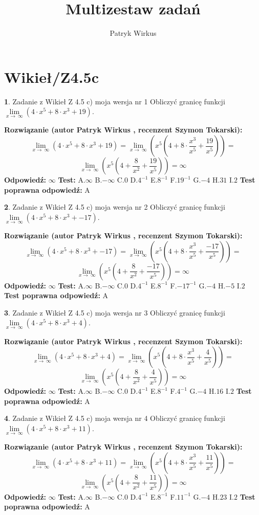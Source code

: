 \documentclass[12pt, a4paper]{article}
\title{Multizestaw zadań}
\author{Patryk Wirkus}
\date{}
\theoremstyle{definition} %
\newtheorem{zad}{}
\newcommand{\kategoria}[1]{\section{#1}}
\newcommand{\zadStart}[1]{\begin{zad}#1\newline}
\newcommand{\zadStop}{\end{zad}}
\newcommand{\rozwStart}[2]{\noindent \textbf{Rozwiązanie (autor #1 , recenzent #2): }\newline}
\newcommand{\rozwStop}{\newline}
\newcommand{\odpStart}{\noindent \textbf{Odpowiedź:}\newline}
\newcommand{\odpStop}{\newline}
\newcommand{\testStart}{\noindent \textbf{Test:}\newline}
\newcommand{\testStop}{\newline}
\newcommand{\kluczStart}{\noindent \textbf{Test poprawna odpowiedź:}\newline}
\newcommand{\kluczStop}{\newline}
\begin{document}
\maketitle

\kategoria{Wikieł/Z4.5c}


\zadStart{Zadanie z Wikieł Z 4.5 c) moja wersja nr 1}
Obliczyć granicę funkcji  $\lim\limits_{x\to\ \infty}(4 \cdot x^{5}+8 \cdot x^{3}+19)$.
\zadStop
\rozwStart{Patryk Wirkus}{Szymon Tokarski}
$$\lim\limits_{x\to\ \infty}(4 \cdot x^{5}+8 \cdot x^{3}+19) = \lim\limits_{x\to\ \infty}(x^{5}(4 +8 \cdot \frac{x^{3}}{x^{5}}+\frac{19}{x^{5}})) =$$ $$\lim\limits_{x\to\ \infty}(x^{5}(4 +\frac{8}{x^{2}}+\frac{19}{x^{5}})) =\infty$$
\rozwStop
\odpStart
$\infty$
\odpStop
\testStart
A.$\infty$ B.$-\infty$ C.$0$ D.$4^{-1}$ E.$8^{-1}$
F.$19^{-1}$ G.$-4$
H.$31$
I.$2$
\testStop
\kluczStart
A
\kluczStop



\zadStart{Zadanie z Wikieł Z 4.5 c) moja wersja nr 2}
Obliczyć granicę funkcji  $\lim\limits_{x\to\ \infty}(4 \cdot x^{5}+8 \cdot x^{3}+-17)$.
\zadStop
\rozwStart{Patryk Wirkus}{Szymon Tokarski}
$$\lim\limits_{x\to\ \infty}(4 \cdot x^{5}+8 \cdot x^{3}+-17) = \lim\limits_{x\to\ \infty}(x^{5}(4 +8 \cdot \frac{x^{3}}{x^{5}}+\frac{-17}{x^{5}})) =$$ $$\lim\limits_{x\to\ \infty}(x^{5}(4 +\frac{8}{x^{2}}+\frac{-17}{x^{5}})) =\infty$$
\rozwStop
\odpStart
$\infty$
\odpStop
\testStart
A.$\infty$ B.$-\infty$ C.$0$ D.$4^{-1}$ E.$8^{-1}$
F.$-17^{-1}$ G.$-4$
H.$-5$
I.$2$
\testStop
\kluczStart
A
\kluczStop



\zadStart{Zadanie z Wikieł Z 4.5 c) moja wersja nr 3}
Obliczyć granicę funkcji  $\lim\limits_{x\to\ \infty}(4 \cdot x^{5}+8 \cdot x^{3}+4)$.
\zadStop
\rozwStart{Patryk Wirkus}{Szymon Tokarski}
$$\lim\limits_{x\to\ \infty}(4 \cdot x^{5}+8 \cdot x^{3}+4) = \lim\limits_{x\to\ \infty}(x^{5}(4 +8 \cdot \frac{x^{3}}{x^{5}}+\frac{4}{x^{5}})) =$$ $$\lim\limits_{x\to\ \infty}(x^{5}(4 +\frac{8}{x^{2}}+\frac{4}{x^{5}})) =\infty$$
\rozwStop
\odpStart
$\infty$
\odpStop
\testStart
A.$\infty$ B.$-\infty$ C.$0$ D.$4^{-1}$ E.$8^{-1}$
F.$4^{-1}$ G.$-4$
H.$16$
I.$2$
\testStop
\kluczStart
A
\kluczStop



\zadStart{Zadanie z Wikieł Z 4.5 c) moja wersja nr 4}
Obliczyć granicę funkcji  $\lim\limits_{x\to\ \infty}(4 \cdot x^{5}+8 \cdot x^{3}+11)$.
\zadStop
\rozwStart{Patryk Wirkus}{Szymon Tokarski}
$$\lim\limits_{x\to\ \infty}(4 \cdot x^{5}+8 \cdot x^{3}+11) = \lim\limits_{x\to\ \infty}(x^{5}(4 +8 \cdot \frac{x^{3}}{x^{5}}+\frac{11}{x^{5}})) =$$ $$\lim\limits_{x\to\ \infty}(x^{5}(4 +\frac{8}{x^{2}}+\frac{11}{x^{5}})) =\infty$$
\rozwStop
\odpStart
$\infty$
\odpStop
\testStart
A.$\infty$ B.$-\infty$ C.$0$ D.$4^{-1}$ E.$8^{-1}$
F.$11^{-1}$ G.$-4$
H.$23$
I.$2$
\testStop
\kluczStart
A
\kluczStop
\end{document}
